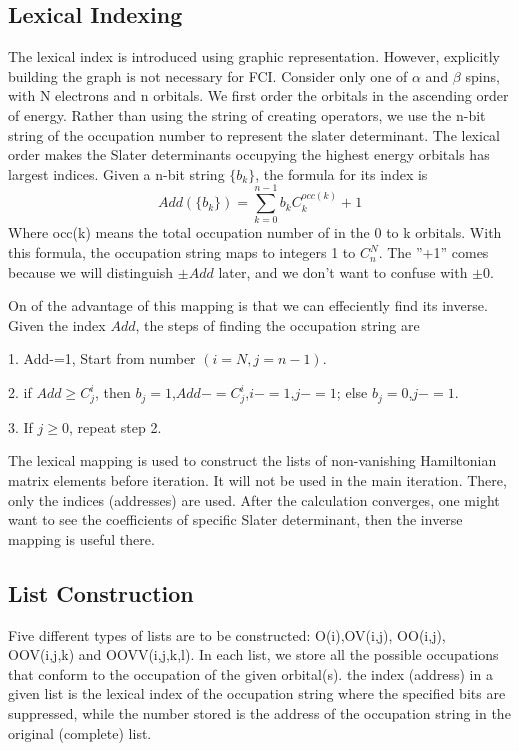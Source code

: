 \documentclass[twocolumn]{article}
\begin{document}
\subsection{Lexical Indexing}
The lexical index is introduced using graphic representation. However, explicitly building the graph is not necessary for FCI.
Consider only one of $\alpha$ and $\beta$ spins, with N electrons and n orbitals. We first order the orbitals in the ascending order of energy.
Rather than using the string of creating operators, we use the n-bit string of the occupation number to represent the slater determinant.
The lexical order makes the Slater determinants occupying the highest energy orbitals has largest indices. 
Given a n-bit string $\{b_k\}$, the formula for its index is
\begin{equation}
  Add(\{b_k\})=\sum_{k=0}^{n-1}b_kC_k^{occ(k)}+1
  \label{eq:add}
\end{equation}
Where occ(k) means the total occupation number of in the 0 to k orbitals. With this formula, the occupation string maps to integers 1 to $C_n^N$.
The ''+1'' comes because we will distinguish $\pm Add$ later, and we don't want to confuse with $\pm 0$. 

On of the advantage of this mapping is that we can effeciently find its inverse. Given the index $Add$, the steps of finding the occupation string are

1. Add-=1, Start from number $(i=N,j=n-1)$.

2. if $Add\geq C_j^i$, then $b_j=1$,$Add-=C_j^i$,$i-=1$,$j-=1$; else $b_j=0$,$j-=1$.

3. If $j\geq 0$, repeat step 2.

The lexical mapping is used to construct the lists of non-vanishing Hamiltonian matrix elements before iteration. It will not be used in the main iteration.
There, only the indices (addresses) are used. After the calculation converges, one might want to see the coefficients of specific Slater determinant,
then the inverse mapping is useful there.

\subsection{List Construction}
Five different types of lists are to be constructed: O(i),OV(i,j), OO(i,j), OOV(i,j,k) and OOVV(i,j,k,l).
In each list, we store all the possible occupations that conform to the occupation of the given orbital(s).
the index (address) in a given list is the lexical index of the occupation string where the specified bits are suppressed, 
while the number stored is the address of the occupation string in the original (complete) list.
\end{document}
